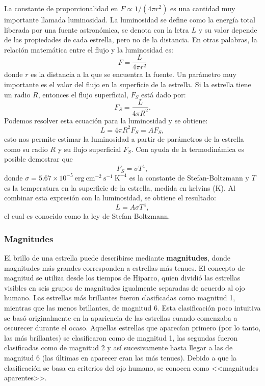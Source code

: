 La constante de proporcionalidad en $ F \propto 1/(4\pi r^2) $ es una cantidad muy importante llamada luminosidad. La luminosidad se define como la energía total liberada por una fuente astronómica, se denota con la letra $ L $ y su valor depende de las propiedades de cada estrella, pero no de la distancia. En otras palabras, la relación matemática entre el flujo y la luminosidad es:
\[ F = \frac{L}{4\pi r^2} \]
donde $ r $ es la distancia a la que se encuentra la fuente. Un parámetro muy importante es el valor del flujo en la superficie de la estrella. Si la estrella tiene un radio $ R $, entonces el flujo superficial, $ F_S $ está dado por:
\[ F_S = \frac{L}{4\pi R^2}. \]
Podemos resolver esta ecuación para la luminosidad y se obtiene:
\[ L = 4\pi R^2 F_S = AF_S, \]
esto nos permite estimar la luminosidad a partir de parámetros de la estrella como su radio $ R $ y su flujo superficial $ F_S $. Con ayuda de la termodinámica es posible demostrar que 
\[ F_S = \sigma T^4, \] 
donde $ \sigma = 5.67 \times 10^{-5} \mathrm{~erg ~ cm^{-2} ~ s^{-1} ~ K^{-4}} $ es la constante de Stefan-Boltzmann y $T$ es la temperatura en la superficie de la estrella, medida en kelvins ($\mathrm{K}$). Al combinar esta expresión con la luminosidad, se obtiene el resultado:
\[ L = A \sigma T^4, \]
el cual es conocido como la ley de Stefan-Boltzmann.

\subsubsection{Magnitudes}
El brillo de una estrella puede describirse mediante \textbf{magnitudes}, donde magnitudes más grandes corresponden a estrellas más tenues. El concepto de magnitud se utiliza desde los tiempos de Hiparco, quien dividió las estrellas visibles en seis grupos de magnitudes igualmente separadas de acuerdo al ojo humano. Las estrellas más brillantes fueron clasificadas como magnitud 1, mientras que las menos brillantes, de magnitud 6. Esta clasificación poco intuitiva se basó originalmente en la apariencia de las estrellas cuando comenzaba a oscurecer durante el ocaso. Aquellas estrellas que aparecían primero (por lo tanto, las más brillantes) se clasificaron como de magnitud  1, las segundas fueron clasificadas como de magnitud 2 y así sucesivamente hasta llegar a las de magnitud 6 (las últimas en aparecer eran las más tenues). Debido a que la clasificación se basa en criterios del ojo humano, se conocen como <<magnitudes aparentes>>.

